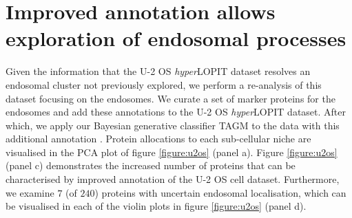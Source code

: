 \documentclass[12pt,english]{article}
\begin{document}
\section{Improved annotation allows exploration of endosomal processes}\label{section:endo}
Given the information that the U-2 OS \textit{hyper}LOPIT dataset resolves an endosomal cluster not previously explored, we perform a re-analysis of this dataset focusing on the endosomes. We curate a set of marker proteins for the endosomes and add these annotations to the U-2 OS \textit{hyper}LOPIT dataset. After which, we apply our Bayesian generative classifier TAGM to the data with this additional annotation \citep{Crook:2018}. Protein allocations to each sub-cellular niche are visualised in the PCA plot of figure \ref{figure:u2os} (panel a). Figure \ref{figure:u2os} (panel c) demonstrates the increased number of proteins that can be characterised by improved annotation of the U-2 OS cell dataset. Furthermore, we examine $7$ (of $240$) proteins with uncertain endosomal localisation, which can be visualised in each of the violin plots in figure \ref{figure:u2os} (panel d).
\end{document}
